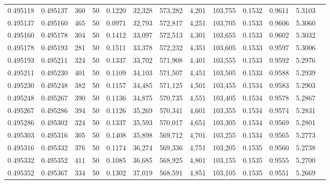 \begin{tabular}{rrrrrrrrrrrrr}
0.495118 & 0.495137 & 360 &  50 &                                     0.1220 &  32,328 & 573,282 &   4,201 & 103,755 & 0.1532 & 0.9611 & 5.3103 \\
0.495137 & 0.495160 & 465 &  50 &                                     0.0971 &  32,793 & 572,817 &   4,251 & 103,705 & 0.1533 & 0.9606 & 5.3060 \\
0.495160 & 0.495178 & 304 &  50 &                                     0.1412 &  33,097 & 572,513 &   4,301 & 103,655 & 0.1533 & 0.9602 & 5.3032 \\
0.495178 & 0.495193 & 281 &  50 &                                     0.1511 &  33,378 & 572,232 &   4,351 & 103,605 & 0.1533 & 0.9597 & 5.3006 \\
0.495193 & 0.495211 & 324 &  50 &                                     0.1337 &  33,702 & 571,908 &   4,401 & 103,555 & 0.1533 & 0.9592 & 5.2976 \\
0.495211 & 0.495230 & 401 &  50 &                                     0.1109 &  34,103 & 571,507 &   4,451 & 103,505 & 0.1533 & 0.9588 & 5.2939 \\
0.495230 & 0.495248 & 382 &  50 &                                     0.1157 &  34,485 & 571,125 &   4,501 & 103,455 & 0.1534 & 0.9583 & 5.2903 \\
0.495248 & 0.495267 & 390 &  50 &                                     0.1136 &  34,875 & 570,735 &   4,551 & 103,405 & 0.1534 & 0.9578 & 5.2867 \\
0.495267 & 0.495286 & 394 &  50 &                                     0.1126 &  35,269 & 570,341 &   4,601 & 103,355 & 0.1534 & 0.9574 & 5.2831 \\
0.495286 & 0.495302 & 324 &  50 &                                     0.1337 &  35,593 & 570,017 &   4,651 & 103,305 & 0.1534 & 0.9569 & 5.2801 \\
0.495303 & 0.495316 & 305 &  50 &                                     0.1408 &  35,898 & 569,712 &   4,701 & 103,255 & 0.1534 & 0.9565 & 5.2773 \\
0.495316 & 0.495332 & 376 &  50 &                                     0.1174 &  36,274 & 569,336 &   4,751 & 103,205 & 0.1535 & 0.9560 & 5.2738 \\
0.495332 & 0.495352 & 411 &  50 &                                     0.1085 &  36,685 & 568,925 &   4,801 & 103,155 & 0.1535 & 0.9555 & 5.2700 \\
0.495352 & 0.495367 & 334 &  50 &                                     0.1302 &  37,019 & 568,591 &   4,851 & 103,105 & 0.1535 & 0.9551 & 5.2669 \\

\end{tabular}
